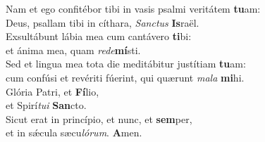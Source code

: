 \evenverse Nam et ego confitébor tibi in vasis psalmi veritátem \textbf{tu}am:~\*\\
\evenverse Deus, psallam tibi in cíthara, \textit{San}\textit{ctus} \textbf{Is}raël.\\
\oddverse Exsultábunt lábia mea cum cantávero \textbf{ti}bi:~\*\\
\oddverse et ánima mea, quam \textit{re}\textit{de}\textbf{mí}sti.\\
\evenverse Sed et lingua mea tota die meditábitur justítiam \textbf{tu}am:~\*\\
\evenverse cum confúsi et revériti fúerint, qui quærunt \textit{ma}\textit{la} \textbf{mi}hi.\\
\oddverse Glória Patri, et \textbf{Fí}lio,~\*\\
\oddverse et Spirí\textit{tu}\textit{i} \textbf{San}cto.\\
\evenverse Sicut erat in princípio, et nunc, et \textbf{sem}per,~\*\\
\evenverse et in sǽcula sæcu\textit{ló}\textit{rum}. \textbf{A}men.\\
